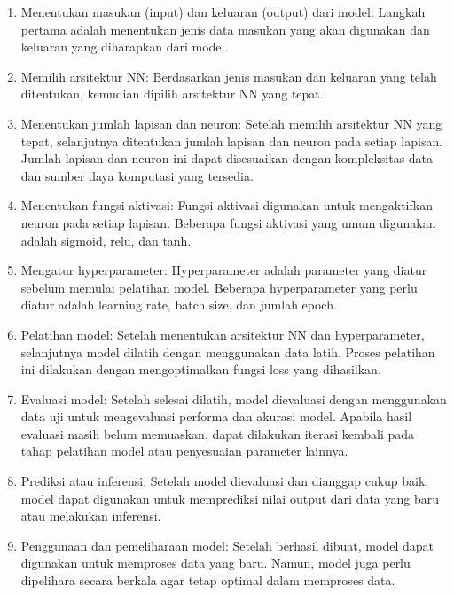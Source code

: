 \begin{enumerate}
	\item Menentukan masukan (input) dan keluaran (output) dari model: Langkah pertama adalah menentukan jenis data masukan yang akan digunakan dan keluaran yang diharapkan dari model. 
	
	\item Memilih arsitektur NN: Berdasarkan jenis masukan dan keluaran yang telah ditentukan, kemudian dipilih arsitektur NN yang tepat.
	
	\item Menentukan jumlah lapisan dan neuron: Setelah memilih arsitektur NN yang tepat, selanjutnya ditentukan jumlah lapisan dan neuron pada setiap lapisan. Jumlah lapisan dan neuron ini dapat disesuaikan dengan kompleksitas data dan sumber daya komputasi yang tersedia.
	
	\item Menentukan fungsi aktivasi: Fungsi aktivasi digunakan untuk mengaktifkan neuron pada setiap lapisan. Beberapa fungsi aktivasi yang umum digunakan adalah sigmoid, relu, dan tanh.
	
	\item Mengatur hyperparameter: Hyperparameter adalah parameter yang diatur sebelum memulai pelatihan model. Beberapa hyperparameter yang perlu diatur adalah learning rate, batch size, dan jumlah epoch.
	
	\item Pelatihan model: Setelah menentukan arsitektur NN dan hyperparameter, selanjutnya model dilatih dengan menggunakan data latih. Proses pelatihan ini dilakukan dengan mengoptimalkan fungsi loss yang dihasilkan.
	
	\item Evaluasi model: Setelah selesai dilatih, model dievaluasi dengan menggunakan data uji untuk mengevaluasi performa dan akurasi model. Apabila hasil evaluasi masih belum memuaskan, dapat dilakukan iterasi kembali pada tahap pelatihan model atau penyesuaian parameter lainnya.
	
	\item Prediksi atau inferensi: Setelah model dievaluasi dan dianggap cukup baik, model dapat digunakan untuk memprediksi nilai output dari data yang baru atau melakukan inferensi.
	
	\item Penggunaan dan pemeliharaan model: Setelah berhasil dibuat, model dapat digunakan untuk memproses data yang baru. Namun, model juga perlu dipelihara secara berkala agar tetap optimal dalam memproses data.
\end{enumerate}

